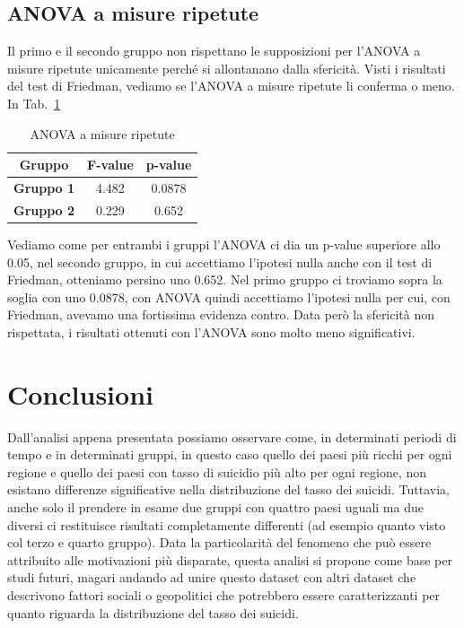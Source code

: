 \documentclass[conference]{IEEEtran}
\begin{document}
\subsection{ANOVA a misure ripetute}

Il primo e il secondo gruppo non rispettano le supposizioni per l'ANOVA a misure ripetute
unicamente perché si allontanano dalla sfericità.
Visti i risultati del test di Friedman, vediamo se l'ANOVA a misure ripetute li conferma
o meno.
In Tab.~\ref{tab7} 
\begin{table}[htbp]
    \caption{ANOVA a misure ripetute}
    \begin{center}
    \begin{tabular}{|c|c|c|}
    \hline
    \textbf{Gruppo} & \textbf{F-value} & \textbf{p-value} \\
    \hline
    \textbf{Gruppo 1} & 4.482 & 0.0878 \\\cline{1-3}
    \textbf{Gruppo 2} & 0.229 & 0.652 \\\cline{1-3}
    \hline
    \end{tabular}
    \label{tab7}
    \end{center}
\end{table}
Vediamo come per entrambi i gruppi l'ANOVA ci dia un p-value superiore allo 0.05,
nel secondo gruppo, in cui accettiamo l'ipotesi nulla anche con il test di Friedman,
otteniamo persino uno 0.652.
Nel primo gruppo ci troviamo sopra la soglia con uno 0.0878, con ANOVA quindi
accettiamo l'ipotesi nulla per cui, con Friedman, avevamo una fortissima evidenza contro.
Data però la sfericità non rispettata, i risultati ottenuti con l'ANOVA sono molto
meno significativi.


\section{Conclusioni}

Dall'analisi appena presentata possiamo osservare come, in determinati periodi di tempo
e in determinati gruppi, in questo caso quello dei paesi più ricchi per ogni regione e
quello dei paesi con tasso di suicidio più alto per ogni regione, non esistano differenze
significative nella distribuzione del tasso dei suicidi.
Tuttavia, anche solo il prendere in esame due gruppi con quattro paesi uguali
ma due diversi ci restituisce risultati completamente differenti (ad esempio quanto
visto col terzo e quarto gruppo).
Data la particolarità del fenomeno che può essere attribuito alle motivazioni più disparate,
questa analisi si propone come base per studi futuri, magari andando ad unire questo dataset
con altri dataset che descrivono fattori sociali o geopolitici che potrebbero
essere caratterizzanti per quanto riguarda la distribuzione del tasso dei suicidi.
\end{document}
